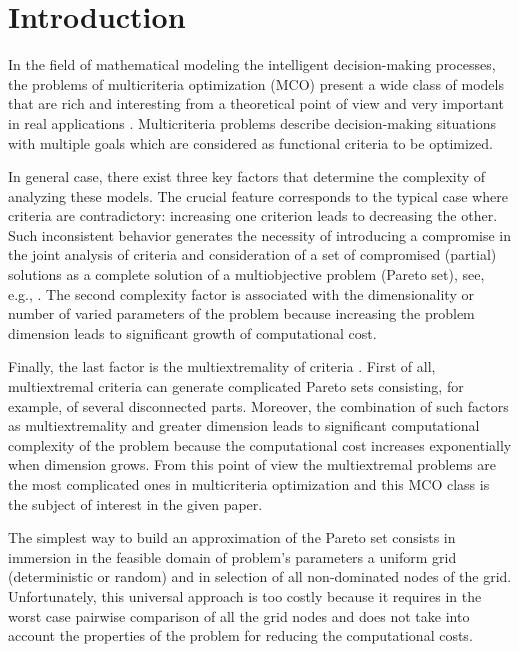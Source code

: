 \documentclass[runningheads]{llncs}
\begin{document}
\section{Introduction}

In the field of mathematical modeling the intelligent decision-making processes, the problems of multicriteria optimization (MCO) present a wide class of models that are rich and interesting from a theoretical point of view and very important in real applications \cite{Marler2009,Hillermeier2005}. Multicriteria problems describe decision-making situations with multiple goals which are considered as functional criteria to be optimized.

In general case, there exist three key factors that determine the complexity of analyzing these models. The crucial feature corresponds to the typical case where criteria are contradictory: increasing one criterion leads to decreasing the other. Such inconsistent behavior generates the necessity of introducing a compromise in the joint analysis of criteria and consideration of a set of compromised (partial) solutions as a complete solution of a multiobjective problem (Pareto set), see, e.g., \cite{Collette2004,Ehrgott2005}.
The second complexity factor is associated with the dimensionality or number of varied parameters of the problem because increasing the problem dimension leads to significant growth of computational cost. 

Finally, the last factor is the multiextremality of criteria \cite{Pardalos2017}. First of all, multiextremal criteria can generate complicated Pareto sets consisting, for example, of several disconnected parts. Moreover, the combination of such factors as multiextremality and greater dimension leads to significant computational complexity of the problem because the computational cost increases exponentially when dimension grows. From this point of view the multiextremal problems are the most complicated ones in multicriteria optimization and this MCO class is the subject of interest in the given paper. 

The simplest way to build an approximation of the Pareto set consists in immersion in the feasible domain of problem's parameters a uniform grid (deterministic or random) and in selection of all non-dominated nodes of the grid. Unfortunately, this universal approach is too costly because it requires in the worst case pairwise comparison of all the grid nodes and does not take into account the properties of the problem for reducing the computational costs.
\end{document}
